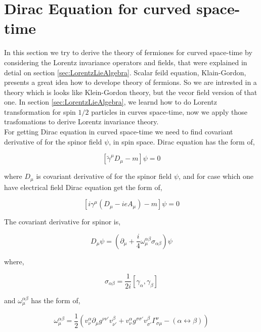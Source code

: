 \section{Dirac Equation for curved space-time}

In this section we try to derive the theory of fermiones for curved space-time by considering the Lorentz invariance operators and fields, that were explained in detial on section \ref{sec:LorentzLieAlgebra}. Scalar feild equation, Klain-Gordon, presents a great idea how to develope theory of fermions. So we are intrested in a theory which is looks like Klein-Gordon theory, but the vecor field version of that one. In section \ref{sec:LorentzLieAlgebra}, we learnd how to do Lorentz transformation for spin $1/2$ particles in curves space-time, now we apply those trasfomations to derive Lorentz invariance theory.\\

For getting Dirac equation in curved space-time we need to find covariant derivative of for the spinor field $\psi$, in spin space. Dirac equation has the form of,

\begin{equation}
   \left[\tilde{\gamma}^{\mu}D_{\mu} - m\right]\psi = 0
\end{equation}

where $D_{\mu}$ is covariant derivative of for the spinor field $\psi$, and for case which one have electrical field Dirac equation get the form of,

\begin{equation}
   \left[i\gamma^{\mu}(D_{\mu} - ieA_{\mu}) - m\right]\psi = 0
\end{equation}

The covariant derivative for spinor is,

\begin{equation}
   D_{\mu} \psi = \left(\partial_{\mu} + \frac{i}{4}\omega^{\alpha\beta}_{\mu}\sigma_{\alpha\beta}\right) \psi
\end{equation}

where,

\begin{equation}
   \sigma_{\alpha\beta} = \frac{1}{2i}[\gamma_{\alpha},\gamma_{\beta}]
\end{equation}

and $\omega^{\alpha\beta}_{\mu}$ has the form of,

\begin{equation}
   \omega^{\alpha\beta}_{\mu} = \frac{1}{2}\left(v^{\alpha}_{\nu}\partial_{\mu}g^{\nu\nu'}v^{\beta}_{\nu'} + v^{\alpha}_{\nu}g^{\sigma\sigma'}v^{\beta}_{\sigma'}\Gamma^{\nu}_{\sigma\mu} - (\alpha \leftrightarrow \beta)\right)
\end{equation}

